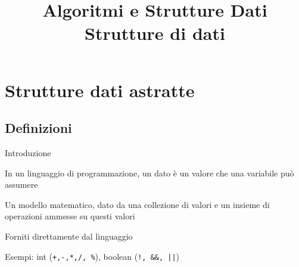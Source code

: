 

 \usepackage{tikz}
\usepackage{xmpmulti}
\usepackage{listings}



\newcommand{\Sum}{\mathit{sum}}


\title[ASD - Strutture dati]{\textbf{Algoritmi e Strutture Dati}\\[24pt]Strutture di dati}

\graphicspath{{figs/03/}}



\FrameTitle{}

\FrameContent

\section{Strutture dati astratte}

\subsection{Definizioni}

\begin{frame}{Introduzione}

\begin{myboxtitle}[Dato]
In un linguaggio di programmazione, un dato è un valore che una variabile può assumere
\end{myboxtitle}

\begin{myboxtitle}
Un modello matematico, dato da una collezione di valori e un insieme di operazioni ammesse su questi valori
\end{myboxtitle}

\begin{myboxtitle}
\BI
\item Forniti direttamente dal linguaggio
\item Esempi: int (\texttt{+,-,*,/, \%}), boolean (\texttt{!, \&\&, ||})
\EI
\end{myboxtitle}

\end{frame}


